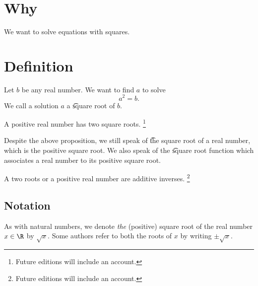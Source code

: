 
\section*{Why}

We want to solve equations with squares.

\section*{Definition}

Let $b$ be any real number.
We want to find $a$ to solve
  \[
a^2 = b.
  \]
We call a solution $a$ a \t{square root} of $b$.

\begin{proposition}
A positive real number has two square roots.
  \ifhmode\unskip\fi\footnote{
Future editions will include an account.
  }
\end{proposition}

Despite the above proposition, we still speak of \t{the square root} of a real number, which is the positive square root.
We also speak of the \t{square root function} which associates a real number to its positive square root.

\begin{proposition}
A two roots or a positive real number are additive inverses.
  \ifhmode\unskip\fi\footnote{
Future editions will include an account.
  }
\end{proposition}

\subsection*{Notation}

As with natural numbers, we denote \textit{the} (positive) square root of the real number $x \in \R $ by $\sqrt{x}$.
Some authors refer to both the roots of $x$ by writing $\pm\sqrt{x}$.

\blankpage